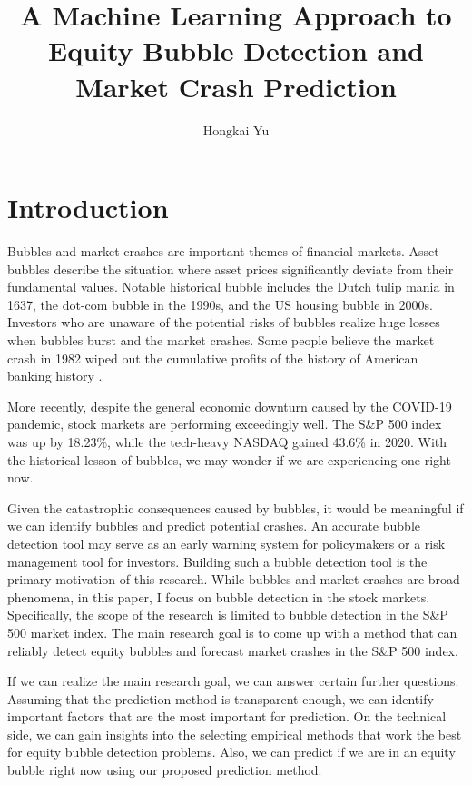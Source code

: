 \documentclass[12pt, man, a4paper, floatsintext]{apa7}
\title{A Machine Learning Approach to Equity Bubble Detection and Market Crash Prediction}
\author{Hongkai Yu}
\affiliation{{Vancouver School of Economics, University of British Columbia
          \\ ECON 490
          \\ Dr. Jonathan Graves
          \\ April 23, 2021}}
\begin{document}
    \linespread{1} %

    \maketitle

    \section{Introduction}
    
Bubbles and market crashes are important themes of financial markets. Asset bubbles describe the situation where asset prices significantly deviate from their fundamental values. Notable historical bubble includes the Dutch tulip mania in 1637, the dot-com bubble in the 1990s, and the US housing bubble in 2000s. Investors who are unaware of the potential risks of bubbles realize huge losses when bubbles burst and the market crashes. Some people believe the market crash in 1982 wiped out the cumulative profits of the history of American banking history \parencite{blackswan}.

More recently, despite the general economic downturn caused by the COVID-19 pandemic, stock markets are performing exceedingly well. The S\&P 500 index was up by 18.23\%, while the tech-heavy NASDAQ gained 43.6\% in 2020. With the historical lesson of bubbles, we may wonder if we are experiencing one right now.

Given the catastrophic consequences caused by bubbles, it would be meaningful if we can identify bubbles and predict potential crashes. An accurate bubble detection tool may serve as an early warning system for policymakers or a risk management tool for investors. Building such a bubble detection tool is the primary motivation of this research. While bubbles and market crashes are broad phenomena, in this paper, I focus on bubble detection in the stock markets. Specifically, the scope of the research is limited to bubble detection in the S\&P 500 market index. The main research goal is to come up with a method that can reliably detect equity bubbles and forecast market crashes in the S\&P 500 index. 

If we can realize the main research goal, we can answer certain further questions. Assuming that the prediction method is transparent enough, we can identify important factors that are the most important for prediction. On the technical side, we can gain insights into the selecting empirical methods that work the best for equity bubble detection problems. Also, we can predict if we are in an equity bubble right now using our proposed prediction method. 
\end{document}
